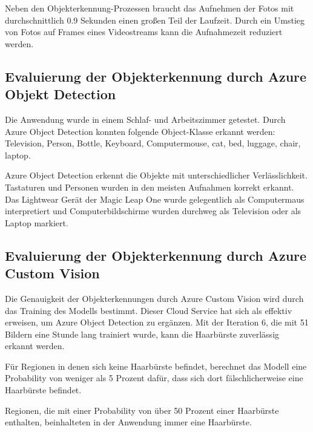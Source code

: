 
Neben den Objekterkennung-Prozessen braucht das Aufnehmen der Fotos mit durchschnittlich 0.9 Sekunden einen großen Teil der Laufzeit. Durch ein Umstieg von Fotos auf Frames eines Videostreams kann die Aufnahmezeit reduziert werden.  


\subsection{Evaluierung der Objekterkennung durch Azure Objekt Detection}

Die Anwendung wurde in einem Schlaf- und Arbeitszimmer getestet. Durch Azure Object Detection konnten folgende Object-Klasse erkannt werden: Television, Person, Bottle, Keyboard, Computermouse, cat, bed, luggage, chair, laptop.

Azure Object Detection erkennt die Objekte mit unterschiedlicher Verlässlichkeit. Tastaturen und Personen wurden in den meisten Aufnahmen korrekt erkannt. Das Lightwear Gerät der Magic Leap One wurde gelegentlich als Computermaus interpretiert und Computerbildschirme wurden durchweg als Television oder als Laptop markiert.

\subsection{Evaluierung der Objekterkennung durch Azure Custom Vision}

Die Genauigkeit der Objekterkennungen durch Azure Custom Vision wird durch das Training des Modells bestimmt. Dieser Cloud Service hat sich als effektiv erweisen, um Azure Object Detection zu ergänzen. Mit der Iteration 6, die mit 51 Bildern eine Stunde lang trainiert wurde, kann die Haarbürste zuverlässig erkannt werden. 

Für Regionen in denen sich keine Haarbürste befindet, berechnet das Modell eine Probability von weniger als 5 Prozent dafür, dass sich dort fälschlicherweise eine Haarbürste befindet. 

Regionen, die mit einer Probability von über 50 Prozent einer Haarbürste enthalten, beinhalteten in der Anwendung immer eine Haarbürste.

